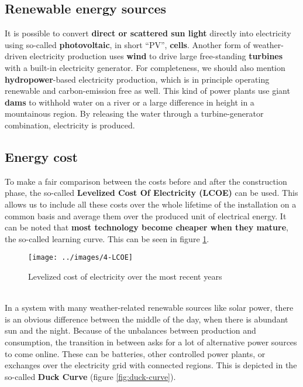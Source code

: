 \documentclass[../summary.tex]{subfiles}
\begin{document}
	\subsection{Renewable energy sources}
	
	It is possible to convert \textbf{direct or scattered sun light} directly into electricity using so-called \textbf{photovoltaic}, in short “PV”, \textbf{cells}. Another form of weather-driven electricity production uses \textbf{wind} to drive large free-standing \textbf{turbines} with a built-in electricity generator. For completeness, we should also mention \textbf{hydropower}-based electricity production, which is in principle operating renewable and carbon-emission free as well. This kind of power plants use giant \textbf{dams} to withhold water on a river or a large difference in height in a mountainous region. By releasing the water through a turbine-generator combination, electricity is produced.
	
	\subsection{Energy cost}
	
	To make a fair comparison between the costs before and after the construction phase, the so-called \textbf{Levelized Cost Of Electricity (LCOE)} can be used. This allows us to include all these costs over the whole lifetime of the installation on a common basis and average them over the produced unit of electrical energy. It can be noted that \textbf{most technology become cheaper when they mature}, the so-called learning curve. This can be seen in figure \ref{fig:lcoe}.
	
	\begin{figure}[H]
		\centering
		\texttt{[image: ../images/4-LCOE]}
		\caption{Levelized cost of electricity over the most recent years}
		\label{fig:lcoe}
	\end{figure}
	
	\ \\
	In a system with many weather-related renewable sources like solar power, there is an obvious difference between the middle of the day, when there is abundant sun and the night. Because of the unbalances between production and consumption, the transition in between asks for a lot of alternative power sources to come online. These can be batteries, other controlled power plants, or exchanges over the electricity grid with connected regions. This is depicted in the so-called \textbf{Duck Curve} (figure \ref{fig:duck-curve}). 
	
\end{document}
